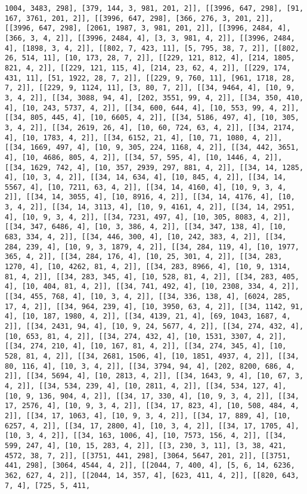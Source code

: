 \documentclass[12pt,fleqn]{article}\usepackage{../../common}
\begin{document}
\begin{verbatim}
1004, 3483, 298], [379, 144, 3, 981, 201, 2]], [[3996, 647, 298], [91, 167, 3761, 201, 2]], [[3996, 647, 298], [366, 276, 3, 201, 2]], [[3996, 647, 298], [2061, 1987, 3, 981, 201, 2]], [[3996, 2484, 4], [366, 3, 4, 2]], [[3996, 2484, 4], [3, 3, 981, 4, 2]], [[3996, 2484, 4], [1898, 3, 4, 2]], [[802, 7, 423, 11], [5, 795, 38, 7, 2]], [[802, 26, 514, 11], [10, 173, 28, 7, 2]], [[229, 121, 812, 4], [214, 1805, 821, 4, 2]], [[229, 121, 115, 4], [214, 23, 62, 4, 2]], [[229, 174, 431, 11], [51, 1922, 28, 7, 2]], [[229, 9, 760, 11], [961, 1718, 28, 7, 2]], [[229, 9, 1124, 11], [3, 80, 7, 2]], [[34, 9464, 4], [10, 9, 3, 4, 2]], [[34, 3088, 94, 4], [202, 3551, 99, 4, 2]], [[34, 350, 410, 4], [10, 243, 5737, 4, 2]], [[34, 600, 644, 4], [10, 553, 99, 4, 2]], [[34, 805, 445, 4], [10, 6605, 4, 2]], [[34, 5186, 497, 4], [10, 305, 3, 4, 2]], [[34, 2619, 26, 4], [10, 60, 724, 63, 4, 2]], [[34, 2174, 4], [10, 1783, 4, 2]], [[34, 6152, 21, 4], [10, 71, 1080, 4, 2]], [[34, 1669, 497, 4], [10, 9, 305, 224, 1168, 4, 2]], [[34, 442, 3651, 4], [10, 4686, 805, 4, 2]], [[34, 57, 595, 4], [10, 1446, 4, 2]], [[34, 1629, 742, 4], [10, 357, 2939, 297, 881, 4, 2]], [[34, 14, 1285, 4], [10, 3, 4, 2]], [[34, 14, 634, 4], [10, 845, 4, 2]], [[34, 14, 5567, 4], [10, 7211, 63, 4, 2]], [[34, 14, 4160, 4], [10, 9, 3, 4, 2]], [[34, 14, 3055, 4], [10, 8916, 4, 2]], [[34, 14, 4176, 4], [10, 3, 4, 2]], [[34, 14, 3113, 4], [10, 9, 4161, 4, 2]], [[34, 14, 2951, 4], [10, 9, 3, 4, 2]], [[34, 7231, 497, 4], [10, 305, 8083, 4, 2]], [[34, 347, 6486, 4], [10, 3, 386, 4, 2]], [[34, 347, 138, 4], [10, 683, 334, 4, 2]], [[34, 446, 300, 4], [10, 242, 383, 4, 2]], [[34, 284, 239, 4], [10, 9, 3, 1879, 4, 2]], [[34, 284, 119, 4], [10, 1977, 365, 4, 2]], [[34, 284, 176, 4], [10, 25, 301, 4, 2]], [[34, 283, 1270, 4], [10, 4262, 81, 4, 2]], [[34, 283, 8966, 4], [10, 9, 1314, 81, 4, 2]], [[34, 283, 345, 4], [10, 528, 81, 4, 2]], [[34, 283, 405, 4], [10, 404, 81, 4, 2]], [[34, 741, 492, 4], [10, 2308, 334, 4, 2]], [[34, 455, 768, 4], [10, 3, 4, 2]], [[34, 336, 138, 4], [6024, 285, 17, 4, 2]], [[34, 964, 239, 4], [10, 3950, 63, 4, 2]], [[34, 1142, 91, 4], [10, 187, 1980, 4, 2]], [[34, 4139, 21, 4], [69, 1043, 1687, 4, 2]], [[34, 2431, 94, 4], [10, 9, 24, 5677, 4, 2]], [[34, 274, 432, 4], [10, 653, 81, 4, 2]], [[34, 274, 432, 4], [10, 1531, 3307, 4, 2]], [[34, 274, 210, 4], [10, 167, 81, 4, 2]], [[34, 274, 345, 4], [10, 528, 81, 4, 2]], [[34, 2681, 1506, 4], [10, 1851, 4937, 4, 2]], [[34, 80, 116, 4], [10, 3, 4, 2]], [[34, 3794, 94, 4], [202, 8200, 686, 4, 2]], [[34, 5694, 4], [10, 2813, 4, 2]], [[34, 1643, 9, 4], [10, 67, 3, 4, 2]], [[34, 534, 239, 4], [10, 2811, 4, 2]], [[34, 534, 127, 4], [10, 9, 136, 904, 4, 2]], [[34, 17, 330, 4], [10, 9, 3, 4, 2]], [[34, 17, 2576, 4], [10, 9, 3, 4, 2]], [[34, 17, 823, 4], [10, 508, 484, 4, 2]], [[34, 17, 1063, 4], [10, 9, 3, 4, 2]], [[34, 17, 889, 4], [10, 6257, 4, 2]], [[34, 17, 2800, 4], [10, 3, 4, 2]], [[34, 17, 1705, 4], [10, 3, 4, 2]], [[34, 163, 1006, 4], [10, 7573, 156, 4, 2]], [[34, 599, 247, 4], [10, 15, 283, 4, 2]], [[3, 230, 3, 11], [3, 38, 421, 4572, 38, 7, 2]], [[3751, 441, 298], [3064, 5647, 201, 2]], [[3751, 441, 298], [3064, 4544, 4, 2]], [[2044, 7, 400, 4], [5, 6, 14, 6236, 362, 627, 4, 2]], [[2044, 14, 357, 4], [623, 411, 4, 2]], [[820, 643, 7, 4], [725, 5, 411, 
\end{verbatim}
\end{document}
